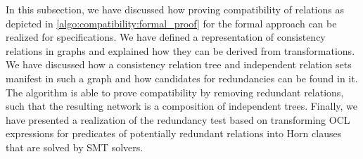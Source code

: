 

In this subsection, we have discussed how proving compatibility of relations as depicted in \autoref{algo:compatibility:formal_proof} for the formal approach can be realized for \qvtr specifications.
We have defined a representation of consistency relations in graphs and explained how they can be derived from \qvtr transformations.
We have discussed how a consistency relation tree and independent relation sets manifest in such a graph and how candidates for redundancies can be found in it. %
The algorithm is able to prove compatibility by removing redundant relations, such that the resulting network is a composition of independent trees.
Finally, we have presented a realization of the redundancy test based on transforming \gls{OCL} expressions for predicates of potentially redundant relations into Horn clauses that are solved by \gls{SMT} solvers.
